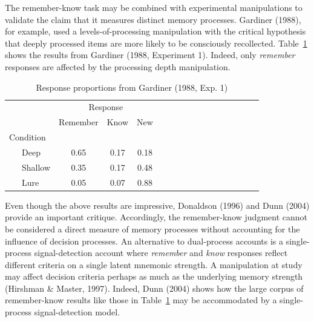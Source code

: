 \documentclass[english,,man]{apa6}
\begin{document}
The remember-know task may be combined with experimental manipulations to validate the claim that it measures distinct memory processes. Gardiner (1988), for example, used a levels-of-processing manipulation with the critical hypothesis that deeply processed items are more likely to be consciously recollected.
Table~\ref{tab:tab1} shows the results from Gardiner (1988, Experiment 1). Indeed, only \emph{remember} responses are affected by the processing depth manipulation.

\begin{table}[tbp]
\begin{center}
\begin{threeparttable}
\caption{\label{tab:tab1}Response proportions from Gardiner (1988, Exp. 1)}
\begin{tabular}{lccclccclccclccc}
\toprule
 & \multicolumn{3}{c}{Response} \\
\cmidrule(r){2-4}
 & \multicolumn{1}{c}{Remember} & \multicolumn{1}{c}{Know} & \multicolumn{1}{c}{New}\\
\midrule
Condition &  &  & \\
\ \ \ Deep & 0.65 & 0.17 & 0.18\\
\ \ \ Shallow & 0.35 & 0.17 & 0.48\\
\ \ \ Lure & 0.05 & 0.07 & 0.88\\
\bottomrule
\end{tabular}
\end{threeparttable}
\end{center}
\end{table}

Even though the above results are impressive, Donaldson (1996) and Dunn (2004) provide an important critique. Accordingly, the remember-know judgment cannot be considered a direct measure of memory processes without accounting for the influence of decision processes.
An alternative to dual-process accounts is a single-process signal-detection account where \emph{remember} and \emph{know} responses reflect different criteria on a single latent mnemonic strength.
A manipulation at study may affect decision criteria perhaps as much as the underlying memory strength (Hirshman \& Master, 1997). Indeed, Dunn (2004) shows how the large corpus of remember-know results like those in Table~\ref{tab:tab1} may be accommodated by a single-process signal-detection model.
\end{document}

